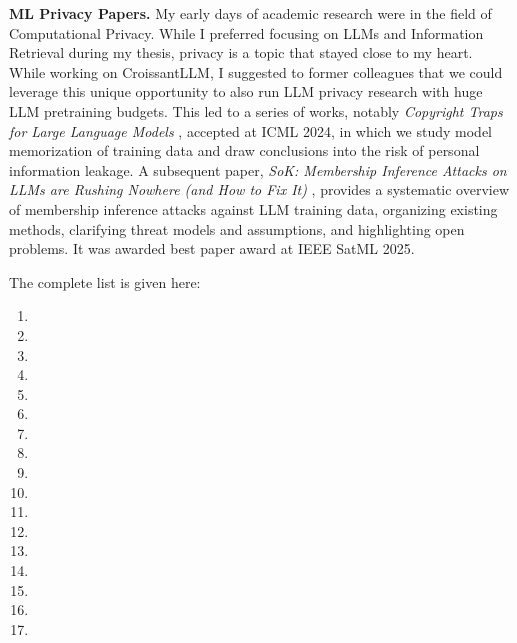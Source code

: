 \noindent\textbf{ML Privacy Papers.} My early days of academic research were in the field of Computational Privacy. While I preferred focusing on LLMs and Information Retrieval during my thesis, privacy is a topic that stayed close to my heart. While working on CroissantLLM, I suggested to former colleagues that we could leverage this unique opportunity to also run LLM privacy research with huge LLM pretraining budgets. This led to a series of works, notably \emph{Copyright Traps for Large Language Models} , accepted at ICML 2024, in which we study model memorization of training data and draw conclusions into the risk of personal information leakage. A subsequent paper, \emph{SoK: Membership Inference Attacks on LLMs are Rushing Nowhere (and How to Fix It)} , provides a systematic overview of membership inference attacks against LLM training data, organizing existing methods, clarifying threat models and assumptions, and highlighting open problems. It was awarded best paper award at IEEE SatML 2025.

The complete list is given here:

\begin{enumerate}
    \item {}
    \item {}
    \item {}
    \item {}
    \item {}
    \item {}
    \item {}
    \item {}
    \item {}
    \item {}
    \item {}
    \item {}

    \item {}
    \item {}
    \item {}
    \item {}
    \item {}
\end{enumerate}


